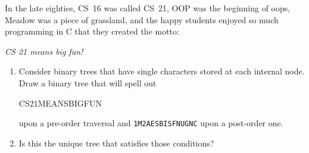 In the late eighties, CS~16 was called CS~21, OOP was the
beginning of oops, Meadow was a piece of grassland, and the happy
students enjoyed so much programming in C that they created the motto:

\centerline{\em CS 21 means big fun!}

\begin{enumerate}

\item  Consider binary trees that have single characters stored at each
internal node.  Draw a binary tree that  will spell out {\tt

CS21MEANSBIGFUN} upon a pre-order traversal and {\tt 1M2AESBISFNUGNC}
upon a post-order one. 

\item  Is this the unique tree that satisfies those conditions?

\end{enumerate}


